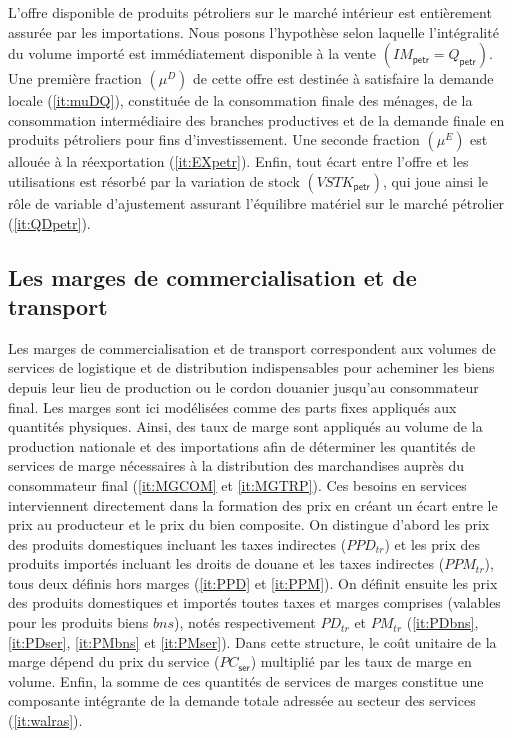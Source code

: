 \documentclass[11pt,a4paper]{article}
\newcommand{\bns}{\mathit{bns}}
\newcommand{\IM}{\mathit{IM}}
\newcommand{\ser}{\mathsf{ser}}
\newcommand{\PC}{\mathit{PC}}
\newcommand{\PD}{\mathit{PD}}
\newcommand{\PPD}{\mathit{PPD}}
\newcommand{\PM}{\mathit{PM}}
\newcommand{\PPM}{\mathit{PPM}}
\newcommand{\petr}{\mathsf{petr}}
\newcommand{\tr}{\mathit{tr}}
\newcommand{\VSTK}{\mathit{VSTK}}
\begin{document}
	L'offre disponible de produits pétroliers sur le marché intérieur est entièrement assurée par les importations. Nous posons l'hypothèse selon laquelle l'intégralité du volume importé est immédiatement disponible à la vente $\left(\IM_{\petr} = Q_{\petr}\right)$. Une première fraction $\left(\mu^D\right)$ de cette offre est destinée à satisfaire la demande locale (\ref{it:muDQ}), constituée de la consommation finale des ménages, de la consommation intermédiaire des branches productives et de la demande finale en produits pétroliers pour fins d'investissement. Une seconde fraction $\left(\mu^E\right)$ est allouée à la réexportation (\ref{it:EXpetr}). Enfin, tout écart entre l'offre et les utilisations est résorbé par la variation de stock $\left(\VSTK_{\petr}\right)$, qui joue ainsi le rôle de variable d'ajustement assurant l'équilibre matériel sur le marché pétrolier (\ref{it:QDpetr}).
	
	\subsection{Les marges de commercialisation et de transport}
	Les marges de commercialisation et de transport correspondent aux volumes de services de logistique et de distribution indispensables pour acheminer les biens depuis leur lieu de production ou le cordon douanier jusqu'au consommateur final. Les marges sont ici modélisées comme des parts fixes appliqués aux quantités physiques. Ainsi, des taux de marge sont appliqués au volume de la production nationale et des importations afin de déterminer les quantités de services de marge nécessaires à la distribution des marchandises auprès du consommateur final (\ref{it:MGCOM} et \ref{it:MGTRP}). Ces besoins en services interviennent directement dans la formation des prix en créant un écart entre le prix au producteur et le prix du bien composite. On distingue d'abord les prix des produits domestiques incluant les taxes indirectes ($\PPD_{tr}$) et les prix des produits importés incluant les droits de douane et les taxes indirectes ($\PPM_{tr}$), tous deux définis hors marges (\ref{it:PPD} et \ref{it:PPM}). On définit ensuite les prix des produits domestiques et importés toutes taxes et marges comprises (valables pour les produits biens $\bns$), notés respectivement $\PD_{\tr}$ et $\PM_{\tr}$ (\ref{it:PDbns}, \ref{it:PDser}, \ref{it:PMbns} et \ref{it:PMser}). Dans cette structure, le coût unitaire de la marge dépend du prix du service  ($\PC_{\ser}$) multiplié par les taux de marge en volume. Enfin, la somme de ces quantités de services de marges constitue une composante intégrante de la demande totale adressée au secteur des services (\ref{it:walras}).
	
\end{document}
